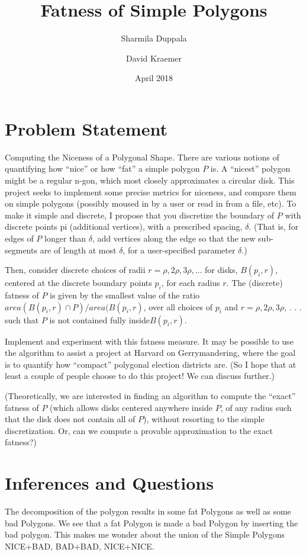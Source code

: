 \documentclass{article}
\title{Fatness of Simple Polygons}
\author{Sharmila Duppala \and David Kraemer}
\date{April 2018}
\begin{document}
\maketitle

\section{Problem Statement} 

Computing the Niceness of a Polygonal Shape. There are various notions of
quantifying how “nice” or how “fat” a simple polygon $P$ is. A “nicest” polygon
might be a regular n-gon, which most closely approximates a circular disk. This
project seeks to implement some precise metrics for niceness, and compare them
on simple polygons (possibly moused in by a user or read in from a file, etc).
To make it simple and discrete, I propose that you discretize the boundary of
$P$
with discrete points pi (additional vertices), with a prescribed spacing,
$\delta$. (That is, for edges of $P$ longer than $\delta$, add vertices along the
edge so that the new sub-segments are of length at most $\delta$, for a
user-specified parameter $\delta$.)

Then, consider discrete choices of radii $r = \rho, 2\rho, 3\rho, \ldots$ for
disks, $B(p_i,r)$, centered at the discrete boundary points $p_i$, for each
radius $r$. The (discrete) fatness of $P$ is given by the smallest value of the
ratio $area(B(p_i,r)\cap P)/area(B(p_i, r)$, over all choices of $p_i$ and $r =
  \rho, 2\rho, 3\rho$, . . . such that $P$ is not contained fully
  inside$B(p_i,r)$.

Implement and experiment with this fatness measure. It may be possible to use
the algorithm to assist a project at Harvard on Gerrymandering, where the goal
is to quantify how “compact” polygonal election districts are. (So I hope that
at least a couple of people choose to do this project! We can discuss further.)

(Theoretically, we are interested in finding an algorithm to compute the “exact”
fatness of $P$ (which allows disks centered anywhere inside $P$, of any radius
such that the disk does not contain all of $P$), without resorting to the simple
discretization. Or, can we compute a provable approximation to the exact
fatness?)

\section{Inferences and Questions}
The decomposition of the polygon results in some fat Polygons as well as some bad Polygons. We see that a fat Polygon is made a bad Polygon by inserting the bad polygon. This makes me wonder about the union of the Simple Polygons NICE+BAD, BAD+BAD, NICE+NICE. 
\end{document}
